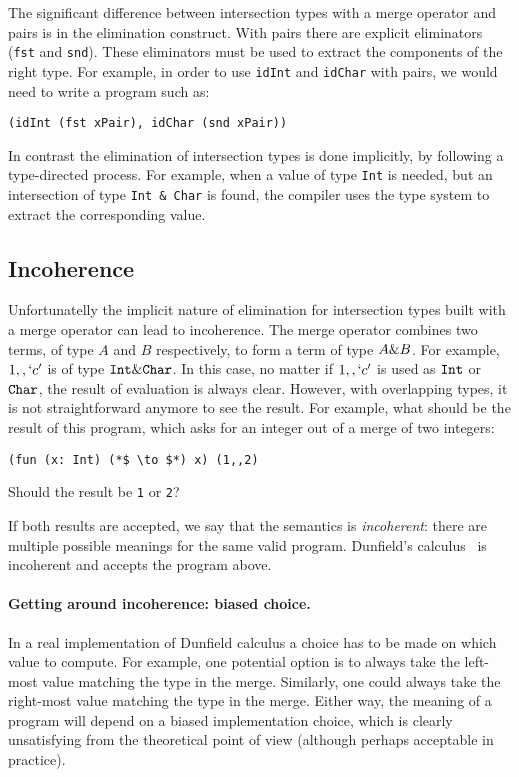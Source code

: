 \noindent The significant difference between intersection types with a
merge operator and pairs is in the elimination construct. With pairs
there are explicit eliminators (\lstinline{fst} and
\lstinline{snd}). These eliminators must be used to extract the
components of the right type. For example, in order to use
\lstinline{idInt} and \lstinline{idChar} with pairs, we would need to
write a program such as:

\begin{lstlisting}
(idInt (fst xPair), idChar (snd xPair))
\end{lstlisting}

\noindent In contrast the elimination of intersection types is done
implicitly, by following a type-directed process. For example,
when a value of type \lstinline{Int} is needed, but an intersection
of type \lstinline{Int & Char} is found, the compiler uses the
type system to extract the corresponding value.

\subsection{Incoherence}\label{subsec:incoherence}
Unfortunatelly the implicit nature of elimination for intersection
types built with a merge operator can lead to incoherence.
The merge operator combines two terms, of type $A$ and $B$
respectively, to form a term of type $A \& B$. For example,
$1 ,, `c'$ is of type $\texttt{Int} \& \texttt{Char}$. In this case, no
matter if $1 ,, `c'$ is used as $\texttt{Int}$ or $\texttt{Char}$, the result
of evaluation is always clear. However, with overlapping types, it is
not straightforward anymore to see the result. For example, what
should be the result of this program, which asks for an integer out of
a merge of two integers:
\begin{lstlisting}
(fun (x: Int) (*$ \to $*) x) (1,,2)
\end{lstlisting}
Should the result be \lstinline$1$ or \lstinline$2$?

If both results are accepted, we say that the semantics is
\emph{incoherent}: there are multiple possible meanings for the same
valid program. Dunfield's calculus~\cite{dunfield2014elaborating} is incoherent and accepts the
program above.

\paragraph{Getting around incoherence: biased choice.}
In a real implementation of Dunfield calculus a choice has to be made
on which value to compute. For example, one potential option is to
always take the left-most value matching the type in the
merge. Similarly, one could always take the right-most
value matching the type in the merge. Either way, the meaning
of a program will depend on a biased implementation choice,
which is clearly unsatisfying from the theoretical point of view
(although perhaps acceptable in practice).

